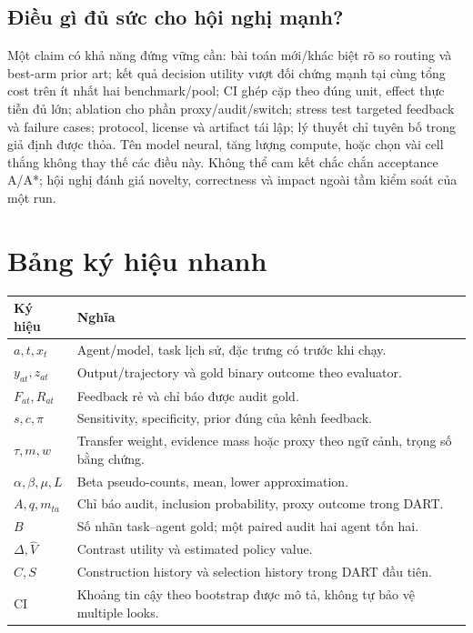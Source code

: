 \documentclass[11pt,a4paper,openany]{book}
\begin{document}
\section{Điều gì đủ sức cho hội nghị mạnh?}
Một claim có khả năng đứng vững cần: bài toán mới/khác biệt rõ so routing và best-arm prior art; kết quả decision utility vượt đối chứng mạnh tại cùng tổng cost trên ít nhất hai benchmark/pool; CI ghép cặp theo đúng unit, effect thực tiễn đủ lớn; ablation cho phần proxy/audit/switch; stress test targeted feedback và failure cases; protocol, license và artifact tái lập; lý thuyết chỉ tuyên bố trong giả định được thỏa. Tên model neural, tăng lượng compute, hoặc chọn vài cell thắng không thay thế các điều này. Không thể cam kết chắc chắn acceptance A/A*; hội nghị đánh giá novelty, correctness và impact ngoài tầm kiểm soát của một run.

\appendix
\chapter{Bảng ký hiệu nhanh}
\begin{longtable}{p{24mm}p{127mm}}\toprule Ký hiệu & Nghĩa\\\midrule\endhead
\(a,t,x_t\) & Agent/model, task lịch sử, đặc trưng có trước khi chạy.\\
\(y_{at},z_{at}\) & Output/trajectory và gold binary outcome theo evaluator.\\
\(F_{at},R_{at}\) & Feedback rẻ và chỉ báo được audit gold.\\
\(s,c,\pi\) & Sensitivity, specificity, prior đúng của kênh feedback.\\
\(\tau,m,w\) & Transfer weight, evidence mass hoặc proxy theo ngữ cảnh, trọng số bằng chứng.\\
\(\alpha,\beta,\mu,L\) & Beta pseudo-counts, mean, lower approximation.\\
\(A,q,m_{ta}\) & Chỉ báo audit, inclusion probability, proxy outcome trong DART.\\
\(B\) & Số nhãn task--agent gold; một paired audit hai agent tốn hai.\\
\(\Delta,\hat V\) & Contrast utility và estimated policy value.\\
\(C,S\) & Construction history và selection history trong DART đầu tiên.\\
CI & Khoảng tin cậy theo bootstrap được mô tả, không tự bảo vệ multiple looks.\\\bottomrule\end{longtable}
\end{document}
